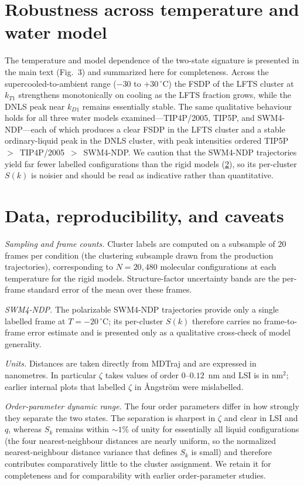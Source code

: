 \documentclass[aps,amsmath,amssymb,onecolumn,superscriptaddress,nofootinbib]{revtex4-2}
\begin{document}
\section{Robustness across temperature and water model}
\label{sn:generality}

The temperature and model dependence of the two-state signature is presented in
the main text (Fig.~3) and summarized here for completeness. Across the
supercooled-to-ambient range ($-30$ to $+30\,^{\circ}$C) the FSDP of the LFTS
cluster at $k_{T1}$ strengthens monotonically on cooling as the LFTS fraction
grows, while the DNLS peak near $k_{D1}$ remains essentially stable. The same
qualitative behaviour holds for all three water models examined---TIP4P/2005,
TIP5P, and SWM4-NDP---each of which produces a clear FSDP in the LFTS cluster and
a stable ordinary-liquid peak in the DNLS cluster, with peak intensities
ordered TIP5P~$>$~TIP4P/2005~$>$~SWM4-NDP. We caution that the SWM4-NDP
trajectories yield far fewer labelled configurations than the rigid models
(\ref{sn:data}), so its per-cluster $S(k)$ is noisier and
should be read as indicative rather than quantitative.

\section{Data, reproducibility, and caveats}
\label{sn:data}

\emph{Sampling and frame counts.}
Cluster labels are computed on a subsample of $20$ frames per condition (the
clustering subsample drawn from the production trajectories), corresponding to
$N=20{,}480$ molecular configurations at each temperature for the rigid models.
Structure-factor uncertainty bands are the per-frame standard error of the mean
over these frames.

\emph{SWM4-NDP.}
The polarizable SWM4-NDP trajectories provide only a single labelled frame at
$T=-20\,^{\circ}$C; its per-cluster $S(k)$ therefore carries no frame-to-frame
error estimate and is presented only as a qualitative cross-check of model
generality.

\emph{Units.}
Distances are taken directly from MDTraj and are expressed in nanometres. In
particular $\zeta$ takes values of order $0$--$0.12$~nm and LSI is in nm$^2$;
earlier internal plots that labelled $\zeta$ in {\AA}ngstr\"om were mislabelled.

\emph{Order-parameter dynamic range.}
The four order parameters differ in how strongly they separate the two states.
The separation is sharpest in $\zeta$ and clear in LSI and $q$, whereas $S_k$
remains within $\sim\!1\%$ of unity for essentially all liquid configurations
(the four nearest-neighbour distances are nearly uniform, so the normalized
nearest-neighbour distance variance that defines $S_k$ is small) and therefore
contributes comparatively little to the cluster assignment. We retain it for completeness and for
comparability with earlier order-parameter studies.
\end{document}
